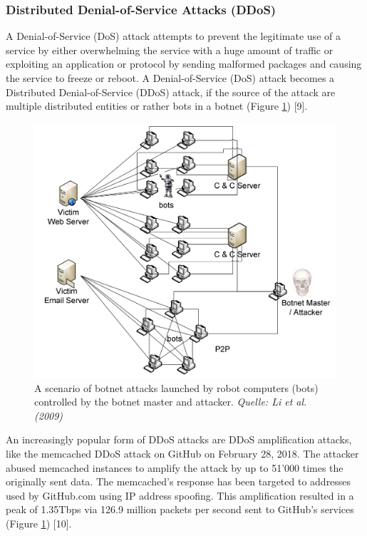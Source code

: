 		\subsubsection{Distributed Denial-of-Service Attacks (DDoS)}
A Denial-of-Service (DoS) attack attempts to prevent the legitimate use of a service by either overwhelming the service with a huge amount of traffic or exploiting an application or protocol by sending malformed packages and causing the service to freeze or reboot. A Denial-of-Service (DoS) attack becomes a Distributed Denial-of-Service (DDoS) attack, if the source of the attack are multiple distributed entities or rather bots in a botnet (Figure \ref{fig:ddos}) [9].

\begin{figure}[ht]
\begin{center} \includegraphics[scale=0.4]{Talk11/DDoS-attack} \end{center}
\caption{A scenario of botnet attacks launched by robot computers (bots) controlled by the botnet master and attacker. \textit{Quelle: Li et al. (2009)}}
\label{fig:ddos}
\end{figure}

An increasingly popular form of DDoS attacks are DDoS amplification attacks, like the memcached DDoS attack on GitHub on February 28, 2018. The attacker abused memcached instances to amplify the attack by up to 51'000 times the originally sent data. The memcached's response has been targeted to addresses used by GitHub.com using IP address spoofing. This amplification resulted in a peak of 1.35Tbps via 126.9 million packets per second sent to GitHub's services (Figure \ref{fig:ddos}) [10].

